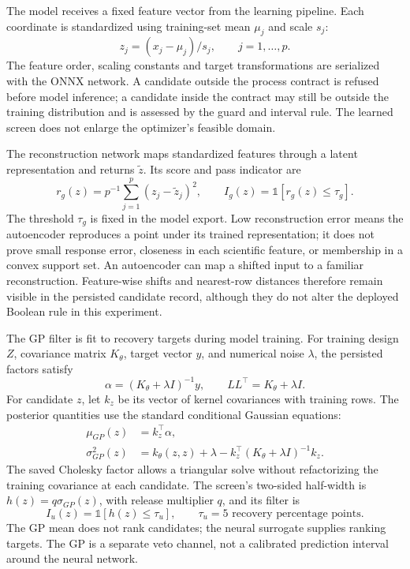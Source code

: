 \documentclass[10pt]{article}
\begin{document}
The model receives a fixed feature vector from the learning pipeline. Each coordinate is standardized using training-set mean $\mu_j$ and scale $s_j$:
\begin{equation}
 z_j=(x_j-\mu_j)/s_j,\qquad j=1,\ldots,p.
\end{equation}
The feature order, scaling constants and target transformations are serialized with the ONNX network. A candidate outside the process contract is refused before model inference; a candidate inside the contract may still be outside the training distribution and is assessed by the guard and interval rule. The learned screen does not enlarge the optimizer's feasible domain.

The reconstruction network maps standardized features through a latent representation and returns $\widetilde z$. Its score and pass indicator are
\begin{equation}
 r_g(z)=p^{-1}\sum_{j=1}^{p}(z_j-\widetilde z_j)^2,\qquad
 I_g(z)=\mathbb{1}[r_g(z)\leq\tau_g].
\end{equation}
The threshold $\tau_g$ is fixed in the model export. Low reconstruction error means the autoencoder reproduces a point under its trained representation; it does not prove small response error, closeness in each scientific feature, or membership in a convex support set. An autoencoder can map a shifted input to a familiar reconstruction. Feature-wise shifts and nearest-row distances therefore remain visible in the persisted candidate record, although they do not alter the deployed Boolean rule in this experiment.

The GP filter is fit to recovery targets during model training. For training design $Z$, covariance matrix $K_\theta$, target vector $y$, and numerical noise $\lambda$, the persisted factors satisfy
\begin{equation}
 \alpha=(K_\theta+\lambda I)^{-1}y,\qquad LL^\top=K_\theta+\lambda I.
\end{equation}
For candidate $z$, let $k_z$ be its vector of kernel covariances with training rows. The posterior quantities use the standard conditional Gaussian equations:
\begin{align}
 \mu_{GP}(z)&=k_z^\top\alpha,\\
 \sigma^2_{GP}(z)&=k_\theta(z,z)+\lambda-k_z^\top(K_\theta+\lambda I)^{-1}k_z.
\end{align}
The saved Cholesky factor allows a triangular solve without refactorizing the training covariance at each candidate. The screen's two-sided half-width is $h(z)=q\sigma_{GP}(z)$, with release multiplier $q$, and its filter is
\begin{equation}
 I_u(z)=\mathbb{1}[h(z)\leq\tau_u],\qquad \tau_u=5\text{ recovery percentage points}.
\end{equation}
The GP mean does not rank candidates; the neural surrogate supplies ranking targets. The GP is a separate veto channel, not a calibrated prediction interval around the neural network.
\end{document}
